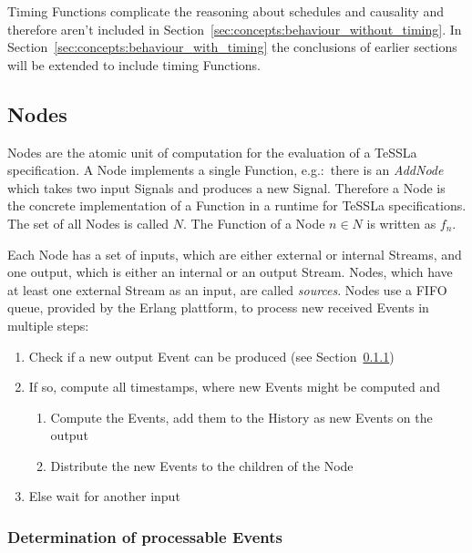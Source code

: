 Timing Functions complicate the reasoning about schedules and causality and therefore aren't included in Section~\ref{sec:concepts:behaviour_without_timing}.
In Section~\ref{sec:concepts:behaviour_with_timing} the conclusions of earlier sections will be extended to include timing Functions.


\subsection{Nodes}
\label{sec:concepts:defs:nodes}

Nodes are the atomic unit of computation for the evaluation of a TeSSLa specification.
A Node implements a single Function, e.g.:\ there is an \emph{AddNode} which takes two input Signals and produces a new Signal.
Therefore a Node is the concrete implementation of a Function in a runtime for TeSSLa specifications.
The set of all Nodes is called \(N\).
The Function of a Node \(n \in N\) is written as \(f_n\).

Each Node has a set of inputs, which are either external or internal Streams, and one output, which is either an internal or an output Stream.
Nodes, which have at least one external Stream as an input, are called \emph{sources}.
Nodes use a FIFO queue, provided by the Erlang plattform, to process new received Events in multiple steps:

\begin{enumerate}
  \item Check if a new output Event can be produced (see Section~\ref{sec:concepts:defs:nodes:processable})
  \item If so, compute all timestamps, where new Events might be computed and
    \begin{enumerate}
      \item Compute the Events, add them to the History as new Events on the output
      \item Distribute the new Events to the children of the Node
    \end{enumerate}
  \item Else wait for another input
\end{enumerate}

\subsubsection{Determination of processable Events}
\label{sec:concepts:defs:nodes:processable}

